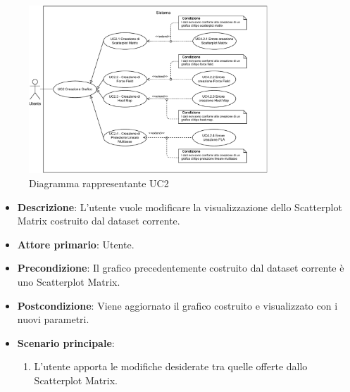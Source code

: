 \begin{figure}[h]
    \centering
    \includegraphics[width=0.8\textwidth]{componenti/casi-duso/diagrammi/UC2.pdf}
    \caption{Diagramma rappresentante UC2}
    \label{fig:UC2}
\end{figure}


\begin{itemize}
    \item \textbf{Descrizione}: L’utente vuole modificare la visualizzazione dello Scatterplot Matrix
                                costruito dal dataset corrente.
	
    \item \textbf{Attore primario}: Utente.
    
    \item \textbf{Precondizione}:   Il grafico precedentemente costruito dal dataset corrente è uno Scatterplot Matrix.

    \item \textbf{Postcondizione}:  Viene aggiornato il grafico costruito e visualizzato con i nuovi parametri.

	\item \textbf{Scenario principale}:
		\begin{enumerate}
            \item L'utente apporta le modifiche desiderate tra quelle offerte dallo Scatterplot Matrix.
        \end{enumerate}
\end{itemize}


